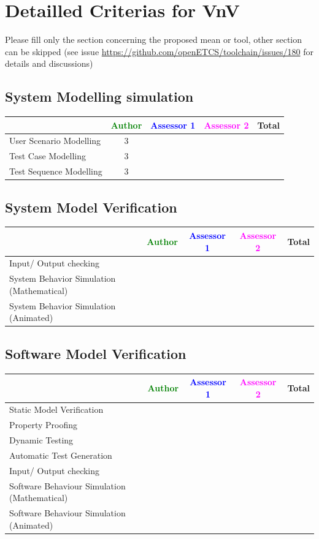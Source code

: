 \section{Detailled Criterias for VnV}

Please  fill only the section concerning the proposed mean or tool, other section can be skipped (see issue \url{https://github.com/openETCS/toolchain/issues/180} for details and discussions)



\subsection{System Modelling simulation}	

\begin{tabular}{|l | c | c | c | c|}
\hline
& \textcolor{green}{Author} & \textcolor{blue}{Assessor 1} & \textcolor{magenta}{Assessor 2} & Total \\
\hline 
User Scenario Modelling &3 & & &  \\
\hline
Test Case Modelling &3 & & &  \\
\hline
Test Sequence Modelling &3 & & &  \\
\hline
\end{tabular}
	
\subsection{System Model Verification}	


\begin{tabular}{|l | c | c | c | c|}
\hline
& \textcolor{green}{Author} & \textcolor{blue}{Assessor 1} & \textcolor{magenta}{Assessor 2} & Total \\
\hline 
Input/ Output checking & & & &  \\
\hline
System Behavior Simulation (Mathematical) & & & &  \\
\hline
System Behavior Simulation (Animated) & & & &  \\
\hline
\end{tabular}


\subsection{Software Model Verification	}


\begin{tabular}{|l | c | c | c | c|}
\hline
& \textcolor{green}{Author} & \textcolor{blue}{Assessor 1} & \textcolor{magenta}{Assessor 2} & Total \\
\hline 
Static Model Verification & & & &  \\
\hline
Property Proofing & & & &  \\
\hline
Dynamic Testing & & & &  \\
\hline
Automatic Test Generation & & & &  \\
\hline
Input/ Output checking & & & &  \\
\hline
Software Behaviour Simulation (Mathematical) & & & &  \\
\hline
Software Behaviour Simulation (Animated) & & & &  \\
\hline
\end{tabular}


